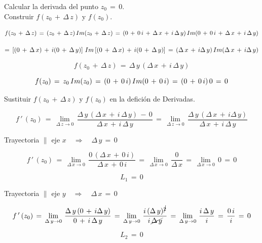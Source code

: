 \documentclass[a4paper,11pt,openany]{book}
\begin{document}

\textcolor{ao(english)}{} Calcular la derivada del punto $z_{0}\,=\,0$.\\

\textcolor{ao(english)}{} Construir $f(z_{0}\,+\,\Delta\,z)$ y $f(z_{0})$.

$$f(z_{0}\,+\,\Delta\,z)\,=\,(z_{0}\,+\,\Delta\,z)\,\mathnormal{Im}(z_{0}\,+\,\Delta\,z)\,=\,(0\,+\,0\,i\,+\,\Delta\,x\,+\,i\,\Delta\,y)\,\mathnormal{Im}(0\,+\,0\,i\,+\,\Delta\,x\,+\,i\,\Delta\,y)$$

$$=\,\left[(0\,+\,\Delta\,x)\,+\,i(0\,+\,\Delta\,y)\right]\,\mathnormal{Im}\left[(0\,+\,\Delta\,x)\,+\,i(0\,+\,\Delta\,y)\right]\,=\,(\Delta\,x\,+\,i\Delta\,y)\,\mathnormal{Im}(\Delta\,x\,+\,i\Delta\,y)$$

$$f(z_{0}\,+\,\Delta\,z)\,=\,\Delta\,y\,(\Delta\,x\,+\,i\,\Delta\,y)$$

$$f(z_{0})\,=\,z_{0}\,\mathnormal{Im}(z_{0})\,=\,(0\,+\,0\,i)\,\mathnormal{Im}(0\,+\,0\,i)\,=\,(0\,+\,0\,i)\,0\,=\,0$$

\textcolor{ao(english)}{} Sustituir  $f(z_{0}\,+\,\Delta\,z)$ y $f(z_{0})$ en la defición de Derivadas.

$$f\,'\,(z_{0})\,=\,\displaystyle\lim_{\Delta\,z \to 0}\,\dfrac{\Delta\,y\,(\Delta\,x\,+\,i\,\Delta\,y)\,-\,0}{\Delta\,x\,+\,i\,\Delta\,y}\,=\,\displaystyle\lim_{\Delta\,z \to 0}\,\dfrac{\Delta\,y\,(\Delta\,x\,+\,i\Delta\,y)}{\Delta\,x\,+\,i\,\Delta\,y}$$

\textcolor{ao(english)}{} Trayectoria $\parallel$ eje $x \quad\Rightarrow\quad \Delta\,y\,=\,0$

$$f\,'\,(z_{0})\,=\,\displaystyle\lim_{\Delta\,x \to 0}\,\dfrac{0\,(\Delta\,x\,+\,0\,i)}{\Delta\,x\,+\,0\,i}\,=\,\displaystyle\lim_{\Delta\,x \to 0}\,\dfrac{0}{\Delta\,x}\,=\,\displaystyle\lim_{\Delta\,x \to 0}\,0\,=\,0$$

$$L_{1}\,=\,0$$

\textcolor{ao(english)}{} Trayectoria $\parallel$ eje $y \quad\Rightarrow\quad \Delta\,x\,=\,0$

$$f\,'\,(z_{0})\,=\,\displaystyle\lim_{\Delta\,y \to 0}\,\dfrac{\Delta\,y\,(0\,+\,i\Delta\,y)}{0\,+\,i\,\Delta\,y}\,=\,\displaystyle\lim_{\Delta\,y \to 0}\,\dfrac{i\,(\Delta\,y)^{\cancel{2}}}{i\,\cancel{\Delta\,y}}\,=\,\displaystyle\lim_{\Delta\,y \to 0}\,\dfrac{i\,\Delta\,y}{i}\,=\,\dfrac{0\,i}{i}\,=\,0$$

$$L_{2}\,=\,0$$
\end{document}
